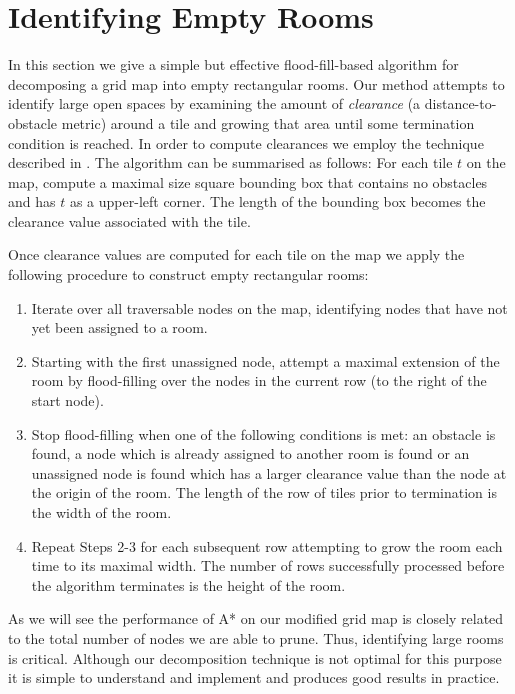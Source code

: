 \section{Identifying Empty Rooms}
\label{empty rooms}
In this section we give a simple but effective flood-fill-based algorithm for decomposing a 
grid map into empty rectangular rooms.
Our method attempts to identify large open spaces by examining the amount of \emph{clearance}
(a distance-to-obstacle metric) around a tile and growing that area until some termination 
condition is reached.
In order to compute clearances we employ the technique described in \cite{harabor08}.
The algorithm can be summarised as follows:
For each tile $t$ on the map, compute a maximal size square bounding box that contains no obstacles
and has $t$ as a upper-left corner.
The length of the bounding box becomes the clearance value associated with the tile.
%
\par
Once clearance values are computed for each tile on the map we apply the following
procedure to construct empty rectangular rooms:


\begin{enumerate}
\item{Iterate over all traversable nodes on the map, identifying nodes that have not yet 
been assigned to a room.}
\item{Starting with the first unassigned node, attempt a maximal extension of the room
by flood-filling over the nodes in the current row (to the right of the start node).}
\item{Stop flood-filling when one of the following conditions is met: an obstacle is found,
a node which is already assigned to another room is found or an unassigned
node is found which has a larger clearance value than the node at the origin of the room.
The length of the row of tiles prior to termination is the width of the room.}
\item{Repeat Steps 2-3 for each subsequent row attempting to grow the room
each time to its maximal width.
The number of rows successfully processed before the algorithm terminates is the height of the room.}
\end{enumerate}


As we will see the performance of A* on our modified grid map is closely related to the total 
number of nodes we are able to prune.
Thus, identifying large rooms is critical.
Although our decomposition technique is not optimal for this purpose it is simple
to understand and implement and produces good results in practice.
